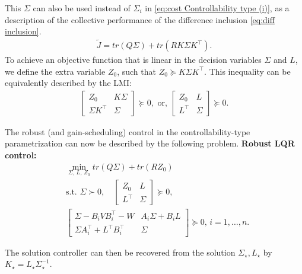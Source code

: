 \documentclass[letterpaper, 10 pt, conference]{ieeeconf}
\newcommand{\trace}{\textit{tr}}
\begin{document}
This $\Sigma$ can also be used instead of $\Sigma_i$ in \eqref{eq:cost Controllability type (i)}, as a description of the collective performance of the difference inclusion \eqref{eq:diff inclusion}.
\begin{align*}
    \tilde J = \trace \left (  Q\Sigma  \right ) + \trace \left ( R K \Sigma  K^\top \right).
\end{align*}
To achieve an objective function that is linear in the decision variables $\Sigma$ and $L$, we define the extra variable $Z_0$, such that $Z_0 \succeq K \Sigma  K^\top$. This inequality can be equivalently described by the LMI:
\begin{align*}
    \begin{bmatrix}
        Z_0 & K \Sigma\\
        \Sigma K^\top & \Sigma
    \end{bmatrix} \succeq 0, \text{ or, }
    \begin{bmatrix}
        Z_0 & L\\
        L^\top & \Sigma
    \end{bmatrix} \succeq 0.
\end{align*}

The robust (and gain-scheduling) control in the controllability-type parametrization can now be described by the following problem.
\vskip 2mm
\textbf{Robust LQR control:}
\begin{equation} \label{eq:Robust LQR problem controllability}
    \begin{aligned}
         &\min_{\Sigma ,\,L,\,Z_0} \trace \left (  Q\Sigma  \right ) + \trace \left ( R Z_0 \right) \\
        &\text{s.t. } \Sigma \succ 0, \quad
        \begin{bmatrix}
            Z_0 & L\\
            L^\top & \Sigma 
        \end{bmatrix}\succeq 0, \\
        &
        \begin{bmatrix}
        \Sigma-B_i V B_i^\top-W & A_i \Sigma + B_i L \\
        \Sigma A_i^\top + L^\top B_i^\top & \Sigma
    \end{bmatrix} \succeq 0, \,i=1,\hdots,n.
    \end{aligned}
\end{equation}

The solution controller can then be recovered from the solution $\Sigma_\star,L_\star$ by $K_\star=L_\star \Sigma_\star^{-1}$.
\end{document}
